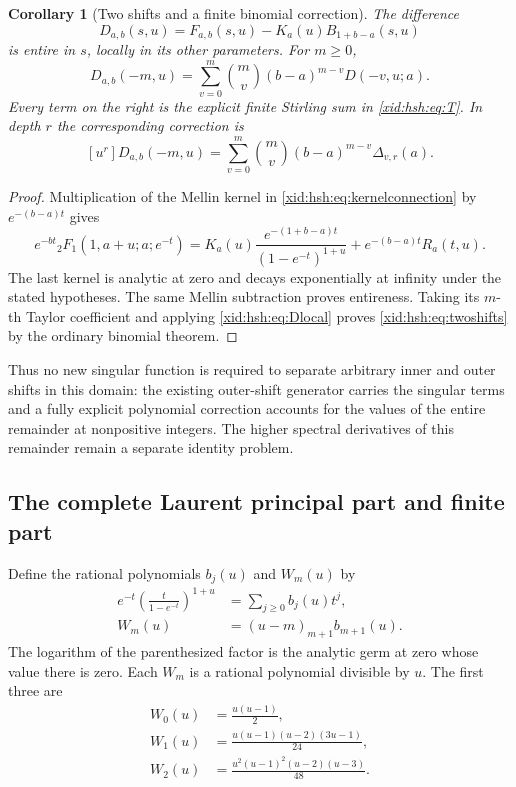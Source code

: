 \documentclass[11pt,a4paper]{article}
\numberwithin{equation}{section}
\newtheorem{corollary}[theorem]{Corollary}
\theoremstyle{definition}
\theoremstyle{remark}
\begin{document}
\begin{corollary}[Two shifts and a finite binomial correction]
\label{xid:hsh:cor:twoshifts}
The difference
\[
 D_{a,b}(s,u)=F_{a,b}(s,u)-K_a(u)B_{1+b-a}(s,u)
\]
is entire in $s$, locally in its other parameters. For $m\ge0$,
\begin{equation}\label{xid:hsh:eq:twoshifts}
 D_{a,b}(-m,u)
   =\sum_{v=0}^m\binom mv(b-a)^{m-v}D(-v,u;a).
\end{equation}
Every term on the right is the explicit finite Stirling sum in
\eqref{xid:hsh:eq:T}. In depth $r$ the corresponding correction is
\[
 [u^r]D_{a,b}(-m,u)
    =\sum_{v=0}^m\binom mv(b-a)^{m-v}\Delta_{v,r}(a).
\]
\end{corollary}
\begin{proof}
Multiplication of the Mellin kernel in \eqref{xid:hsh:eq:kernelconnection}
by $e^{-(b-a)t}$ gives
\[
 e^{-bt}{}_2F_1(1,a+u;a;e^{-t})
   =K_a(u)\frac{e^{-(1+b-a)t}}{(1-e^{-t})^{1+u}}
         +e^{-(b-a)t}R_a(t,u).
\]
The last kernel is analytic at zero and decays exponentially at infinity
under the stated hypotheses. The same Mellin subtraction proves
entireness. Taking its $m$-th Taylor coefficient and applying
\eqref{xid:hsh:eq:Dlocal} proves \eqref{xid:hsh:eq:twoshifts} by the ordinary
binomial theorem.
\end{proof}

Thus no new singular function is required to separate arbitrary inner
and outer shifts in this domain: the existing outer-shift generator
carries the singular terms and a fully explicit polynomial correction
accounts for the values of the entire remainder at nonpositive integers.
The higher spectral derivatives of this remainder remain a separate
identity problem.

\subsection{The complete Laurent principal part and finite part}

Define the rational polynomials $b_j(u)$ and $W_m(u)$ by
\begin{align}
 e^{-t}\left(\frac{t}{1-e^{-t}}\right)^{1+u}
       &=\sum_{j\ge0}b_j(u)t^j,\label{xid:hsh:eq:b}\\
 W_m(u)&=(u-m)_{m+1}b_{m+1}(u).
       \label{xid:hsh:eq:W}
\end{align}
The logarithm of the parenthesized factor is the analytic germ at zero
whose value there is zero. Each $W_m$ is a rational polynomial divisible
by $u$. The first three are
\begin{align}
 W_0(u)&=\frac{u(u-1)}2,\label{xid:hsh:eq:W0}\\
 W_1(u)&=\frac{u(u-1)(u-2)(3u-1)}{24},\\
 W_2(u)&=\frac{u^2(u-1)^2(u-2)(u-3)}{48}.
\end{align}
\end{document}
